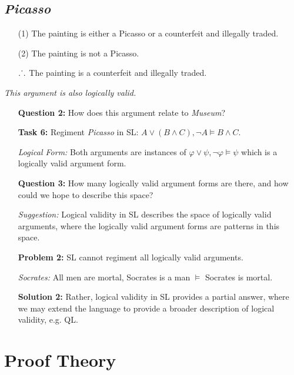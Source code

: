 \documentclass[a4paper, 11pt]{article} %
\def\therefore{\ensuremath{\ldotp\dot{}\,\ldotp}}
\begin{document}
\subsection*{\it \textbf{Picasso}}

\begin{enumerate}
  \item[(1)] The painting is either a Picasso or a counterfeit and illegally traded.
  \item[(2)] The painting is not a Picasso.
  \item[\therefore] The painting is a counterfeit and illegally traded.
\end{enumerate}

\noindent
\textit{This argument is also logically valid.}

\begin{enumerate}[leftmargin=1.2in,labelsep=.15in] %
  \item[\bf Question 2:] How does this argument relate to \textit{Museum}? 
  \item[\bf Task 6:] Regiment \textit{Picasso} in SL: $A\vee (B\wedge C), \neg A \vDash B\wedge C$.
  \item[\it Logical Form:] Both arguments are instances of $\varphi \vee \psi, \neg\varphi \vDash \psi$ which is a logically valid argument form. 
  \item[\bf Question 3:] How many logically valid argument forms are there, and how could we hope to describe this space?
  \item[\it Suggestion:] Logical validity in SL describes the space of logically valid arguments, where the logically valid argument forms are patterns in this space.
  \item[\bf Problem 2:] SL cannot regiment all logically valid arguments.
  \item[\it Socrates:] All men are mortal, Socrates is a man $\vDash$ Socrates is mortal. 
  \item[\bf Solution 2:] Rather, logical validity in SL provides a partial answer, where we may extend the language to provide a broader description of logical validity, e.g. QL.
\end{enumerate}




\section*{Proof Theory}
\end{document}
